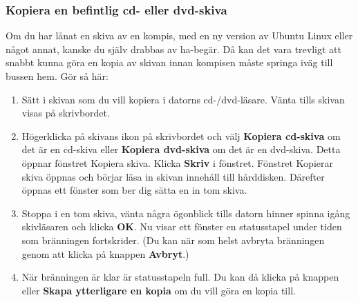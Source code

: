 \documentclass[a4paper,final]{memoir} %
\begin{document}
\xnegskip{}



\subsubsection{Kopiera en befintlig cd- eller dvd-skiva}\label{nautilus-branna-befintlig}


Om du har lånat en skiva av en kompis, med en ny version av Ubuntu Linux eller något annat, kanske du själv drabbas av ha-begär. Då kan det vara trevligt att snabbt kunna göra en kopia av skivan innan kompisen måste springa iväg till bussen hem. Gör så här:

\begin{enumerate}

\item Sätt i skivan som du vill kopiera i datorns cd-/dvd-läsare. Vänta tills skivan visas på skrivbordet.
\item Högerklicka på skivans ikon på skrivbordet och välj \textbf{Kopiera cd-skiva} om det är en cd-skiva eller \textbf{Kopiera dvd-skiva} om det är en dvd-skiva. Detta öppnar fönstret Kopiera skiva. Klicka \textbf{Skriv} i fönstret. Fönstret Kopierar skiva öppnas och börjar läsa in skivan innehåll till hårddisken. Därefter öppnas ett fönster som ber dig sätta en in tom skiva. 
\item Stoppa i en tom skiva, vänta några ögonblick tills datorn hinner spinna igång skivläsaren och klicka \textbf{OK}. Nu visar ett fönster en statusstapel under tiden som bränningen fortskrider. (Du kan när som helst avbryta bränningen genom att klicka på knappen \textbf{Avbryt}.)
\item När bränningen är klar är statusstapeln full. Du kan då klicka på knappen \xstang{} eller \textbf{Skapa ytterligare en kopia} om du vill göra en kopia till.

\end{enumerate}
\end{document}
